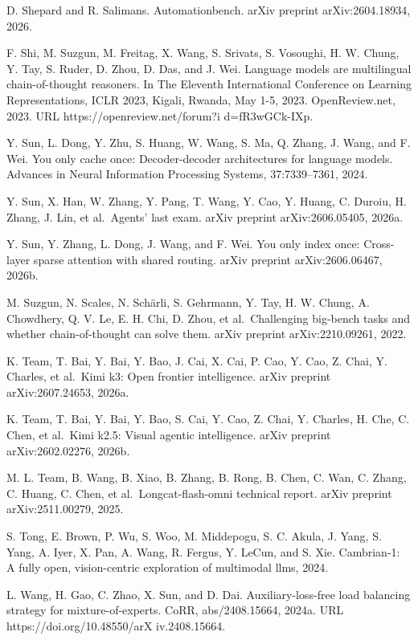 \documentclass[
  10
]{article}
\begin{document}
D. Shepard and R. Salimans. Automationbench. arXiv preprint
arXiv:2604.18934, 2026.

F. Shi, M. Suzgun, M. Freitag, X. Wang, S. Srivats, S. Vosoughi, H. W.
Chung, Y. Tay, S. Ruder, D. Zhou, D. Das, and J. Wei. Language models
are multilingual chain-of-thought reasoners. In The Eleventh
International Conference on Learning Representations, ICLR 2023, Kigali,
Rwanda, May 1-5, 2023. OpenReview.net, 2023. URL
https://openreview.net/forum?i d=fR3wGCk-IXp.

Y. Sun, L. Dong, Y. Zhu, S. Huang, W. Wang, S. Ma, Q. Zhang, J. Wang,
and F. Wei. You only cache once: Decoder-decoder architectures for
language models. Advances in Neural Information Processing Systems,
37:7339--7361, 2024.

Y. Sun, X. Han, W. Zhang, Y. Pang, T. Wang, Y. Cao, Y. Huang, C. Duroiu,
H. Zhang, J. Lin, et al.~Agents' last exam. arXiv preprint
arXiv:2606.05405, 2026a.

Y. Sun, Y. Zhang, L. Dong, J. Wang, and F. Wei. You only index once:
Cross-layer sparse attention with shared routing. arXiv preprint
arXiv:2606.06467, 2026b.

M. Suzgun, N. Scales, N. Schärli, S. Gehrmann, Y. Tay, H. W. Chung, A.
Chowdhery, Q. V. Le, E. H. Chi, D. Zhou, et al.~Challenging big-bench
tasks and whether chain-of-thought can solve them. arXiv preprint
arXiv:2210.09261, 2022.

K. Team, T. Bai, Y. Bai, Y. Bao, J. Cai, X. Cai, P. Cao, Y. Cao, Z.
Chai, Y. Charles, et al.~Kimi k3: Open frontier intelligence. arXiv
preprint arXiv:2607.24653, 2026a.

K. Team, T. Bai, Y. Bai, Y. Bao, S. Cai, Y. Cao, Z. Chai, Y. Charles, H.
Che, C. Chen, et al.~Kimi k2.5: Visual agentic intelligence. arXiv
preprint arXiv:2602.02276, 2026b.

M. L. Team, B. Wang, B. Xiao, B. Zhang, B. Rong, B. Chen, C. Wan, C.
Zhang, C. Huang, C. Chen, et al.~Longcat-flash-omni technical report.
arXiv preprint arXiv:2511.00279, 2025.

S. Tong, E. Brown, P. Wu, S. Woo, M. Middepogu, S. C. Akula, J. Yang, S.
Yang, A. Iyer, X. Pan, A. Wang, R. Fergus, Y. LeCun, and S. Xie.
Cambrian-1: A fully open, vision-centric exploration of multimodal llms,
2024.

L. Wang, H. Gao, C. Zhao, X. Sun, and D. Dai. Auxiliary-loss-free load
balancing strategy for mixture-of-experts. CoRR, abs/2408.15664, 2024a.
URL https://doi.org/10.48550/arX iv.2408.15664.
\end{document}

